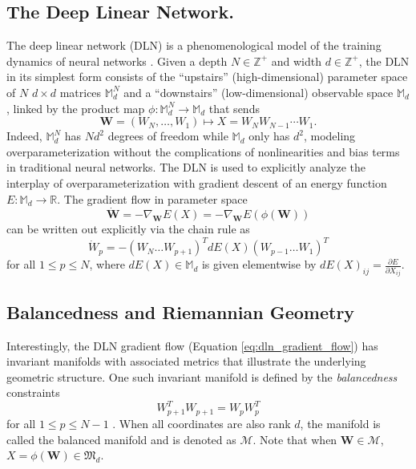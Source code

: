 \documentclass{amsart}
\theoremstyle{definition}
\theoremstyle{remark}
\numberwithin{equation}{section}
\begin{document}
\subsection{The Deep Linear Network.} 
The deep linear network (DLN) is a phenomenological model of the training dynamics of neural networks \cite{arora2018convergence, arora2018optimization, cohen2023deep, menon2024geometry}. Given a depth $N \in \mathbb{Z}^+$ and width $d \in \mathbb{Z}^+$, the DLN in its simplest form consists of the ``upstairs'' (high-dimensional) parameter space of $N$ $d \times d$ matrices $\mathbb{M}_d^N$ and a ``downstairs'' (low-dimensional) observable space $\mathbb{M}_d$, linked by the product map $\phi:\mathbb{M}_d^N \to \mathbb{M}_d$ that sends
\begin{equation}\label{eq:phi}
    \mathbf{W} = (W_N, \ldots, W_1) \mapsto X = W_NW_{N-1}\cdots W_1.
\end{equation}
Indeed, $\mathbb{M}_d^N$ has $Nd^2$ degrees of freedom while $\mathbb{M}_d$ only has $d^2$, modeling overparameterization without the complications of nonlinearities and bias terms in traditional neural networks. The DLN is used to explicitly analyze the interplay of overparameterization with gradient descent of an energy function $E : \mathbb{M}_d \to \mathbb{R}$. The gradient flow in parameter space
\begin{equation}\label{eq:dln_gradient_flow}
\dot{\mathbf{W}} = -\nabla_\mathbf{W} E(X) = -\nabla_\mathbf{W} E(\phi(\mathbf{W}))
\end{equation}
can be written out explicitly via the chain rule as
\begin{equation}\label{eq:chain_rule}
\dot{W}_p = -(W_N\dots W_{p+1})^T dE(X) (W_{p-1}\dots W_1)^T
\end{equation}
for all $1 \leq p \leq N$, where $dE(X) \in \mathbb{M}_d$ is given elementwise by $dE(X)_{ij} = \frac{\partial E}{\partial X_{ij}}$. 

\subsection{Balancedness and Riemannian Geometry} Interestingly, the DLN gradient flow (Equation \ref{eq:dln_gradient_flow}) has invariant manifolds with associated metrics that illustrate the underlying geometric structure. One such invariant manifold is defined by the \textit{balancedness} constraints
\begin{equation}
    W_{p+1}^TW_{p+1} = W_pW_p^T
\end{equation}
for all $1 \leq p \leq N-1$ \cite[Theorem 1]{arora2018optimization}. When all coordinates are also rank $d$, the manifold is called the balanced manifold and is denoted as $\mathcal{M}$. Note that when $\mathbf{W} \in \mathcal{M}$, $X = \phi(\mathbf{W}) \in \mathfrak{M}_d$. 
\end{document}
